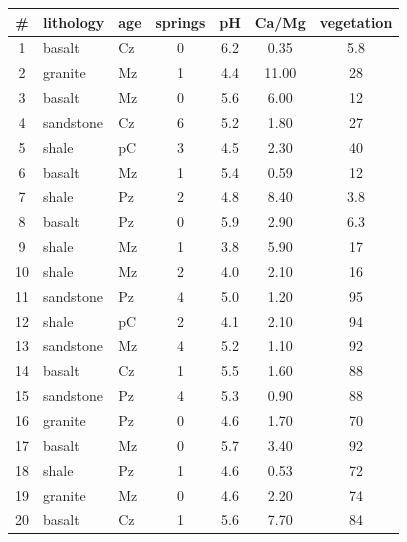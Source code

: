 \noindent\begin{minipage}[t][][b]{.55\linewidth}
\begin{tabular}{c|l@{\gap}l@{\gap}c@{\gap}c@{\gap}c@{\gap}c}
\# & lithology & age & springs & pH & Ca/Mg & vegetation \\ \hline
1 & basalt & Cz & 0 & 6.2 & 0.35 & 5.8 \\
2 & granite & Mz & 1 & 4.4 & 11.00 & 28 \\
3 & basalt & Mz & 0 & 5.6 & 6.00 & 12 \\
4 & sandstone & Cz & 6 & 5.2 & 1.80 & 27 \\
5 & shale & pC & 3 & 4.5 & 2.30 & 40 \\
6 & basalt & Mz & 1 & 5.4 & 0.59 & 12 \\
7 & shale & Pz & 2 & 4.8 & 8.40 & 3.8 \\
8 & basalt & Pz & 0 & 5.9 & 2.90 & 6.3 \\
9 & shale & Mz & 1 & 3.8 & 5.90 & 17 \\
10 & shale & Mz & 2 & 4.0 & 2.10 & 16 \\
11 & sandstone & Pz & 4 & 5.0 & 1.20 & 95 \\
12 & shale & pC & 2 & 4.1 & 2.10 & 94 \\
13 & sandstone & Mz & 4 & 5.2 & 1.10 & 92 \\
14 & basalt & Cz & 1 & 5.5 & 1.60 & 88 \\
15 & sandstone & Pz & 4 & 5.3 & 0.90 & 88 \\
16 & granite & Pz & 0 & 4.6 & 1.70 & 70 \\
17 & basalt & Mz & 0 & 5.7 & 3.40 & 92 \\
18 & shale & Pz & 1 & 4.6 & 0.53 & 72 \\
19 & granite & Mz & 0 & 4.6 & 2.20 & 74 \\
20 & basalt & Cz & 1 & 5.6 & 7.70 & 84 \\
\end{tabular}\medskip
\end{minipage}
\begin{minipage}[t][][t]{.45\linewidth}
\label{tab:catchments}
\end{minipage}\medskip


